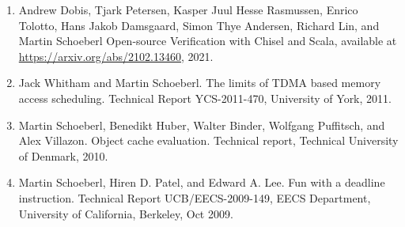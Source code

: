 \documentclass[%
    a4paper,
    11pt, %
    headinclude, footexclude,
    notitlepage,
    headsepline,
    pointlessnumbers,
    ]{scrartcl}
\begin{document}
\begin{enumerate}

\item Andrew Dobis, Tjark Petersen, Kasper Juul Hesse Rasmussen, Enrico Tolotto,
Hans Jakob Damsgaard, Simon Thye Andersen, Richard Lin, and Martin Schoeberl
  Open-source Verification with Chisel
  and Scala, available at \url{https://arxiv.org/abs/2102.13460}, 2021.

\item Jack Whitham and Martin Schoeberl.
 The limits of TDMA based memory access scheduling.
 Technical Report YCS-2011-470, University of York, 2011.

\item Martin Schoeberl, Benedikt Huber, Walter Binder, Wolfgang Puffitsch, and Alex
  Villazon.
 Object cache evaluation.
 Technical report, Technical University of Denmark, 2010.

\item Martin Schoeberl, Hiren D. Patel, and Edward A. Lee. Fun
    with a deadline instruction. Technical Report
UCB/EECS-2009-149, EECS Department, University of
  California, Berkeley, Oct 2009.
 

\end{enumerate}
\end{document}
